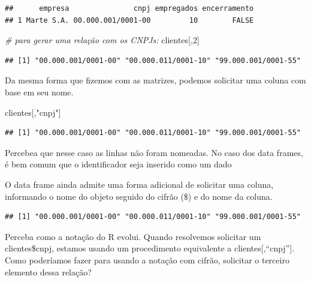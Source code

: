 \documentclass[
]{book}
\newenvironment{Shaded}{\begin{snugshade}}{\end{snugshade}}
\newcommand{\CommentTok}[1]{\textcolor[rgb]{0.56,0.35,0.01}{\textit{#1}}}
\newcommand{\DecValTok}[1]{\textcolor[rgb]{0.00,0.00,0.81}{#1}}
\newcommand{\NormalTok}[1]{#1}
\newcommand{\OperatorTok}[1]{\textcolor[rgb]{0.81,0.36,0.00}{\textbf{#1}}}
\newcommand{\StringTok}[1]{\textcolor[rgb]{0.31,0.60,0.02}{#1}}
\begin{document}
\begin{verbatim}
##      empresa               cnpj empregados encerramento
## 1 Marte S.A. 00.000.001/0001-00         10        FALSE
\end{verbatim}

\begin{Shaded}
\begin{Highlighting}[]
\CommentTok{# para gerar uma relação com os CNPJs:}
\NormalTok{clientes[,}\DecValTok{2}\NormalTok{]}
\end{Highlighting}
\end{Shaded}

\begin{verbatim}
## [1] "00.000.001/0001-00" "00.000.011/0001-10" "99.000.001/0001-55"
\end{verbatim}

Da mesma forma que fizemos com as matrizes, podemos solicitar uma coluna com base em seu nome.

\begin{Shaded}
\begin{Highlighting}[]
\NormalTok{clientes[,}\StringTok{"cnpj"}\NormalTok{]}
\end{Highlighting}
\end{Shaded}

\begin{verbatim}
## [1] "00.000.001/0001-00" "00.000.011/0001-10" "99.000.001/0001-55"
\end{verbatim}

Percebea que nesse caso as linhas não foram nomeadas. No caso dos data frames, é bem comum que o identificador seja inserido como um dado

O data frame ainda admite uma forma adicional de solicitar uma coluna, informando o nome do objeto seguido do cifrão (\$) e do nome da coluna.

\begin{Shaded}
\end{Shaded}

\begin{verbatim}
## [1] "00.000.001/0001-00" "00.000.011/0001-10" "99.000.001/0001-55"
\end{verbatim}

Perceba como a notação do R evolui. Quando resolvemos solicitar um clientes\$cnpj, estamos usando um procedimento equivalente a clientes{[},``cnpj''{]}. Como poderíamos fazer para usando a notação com cifrão, solicitar o terceiro elemento dessa relação?
\end{document}
